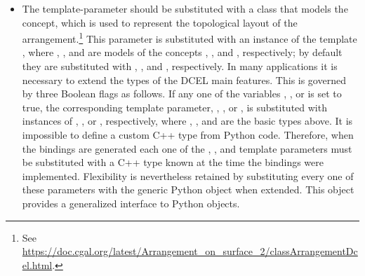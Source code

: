 \begin{itemize}
  The \cmake{} flag  specifies which geometry traits should be used for the generated bindings; see Table~\ref{tab:aos:gt}. Observe that an instance of the  class template (see Section~\ref{ssec:modules:bso2}) employs a 2D arrangement type. Bindings for instances of  is enabled as part of the bindings for the \iiDRegularizedBooleanSetOperationsPackage{} package. When bindings for this package is enabled, the traits parameter must be substituted with a traits class that also models the  concept; see Figure~\ref{fig:bso2}. The appropriate final traits type is automatically defined by the system.
\item The  template-parameter should be substituted with a class that models the  concept, which is used to represent the topological layout of the arrangement.\footnote{See \url{https://doc.cgal.org/latest/Arrangement_on_surface_2/classArrangementDcel.html}.} This parameter is substituted with an instance of the template , where , , and  are models of the concepts\linebreak
{}, , and , respectively; by default they are substituted with , , and , respectively. In many applications it is necessary to extend the types of the DCEL main features. This is governed by three \cmake{} Boolean flags as follows. If any one of the \cmake{} variables , , or  is set to true, the corresponding template parameter, , , or , is substituted with instances of , , or , respectively, where , , and  are the basic types above.
%
  It is impossible to define a custom C++ type from Python code. Therefore, when the bindings are generated each one of the , , and    template parameters must be substituted with a C++ type known at the time the bindings were implemented. Flexibility is nevertheless retained by substituting every one of these parameters with the generic Python object  when extended. This object provides a generalized interface to Python objects.

\end{itemize}
